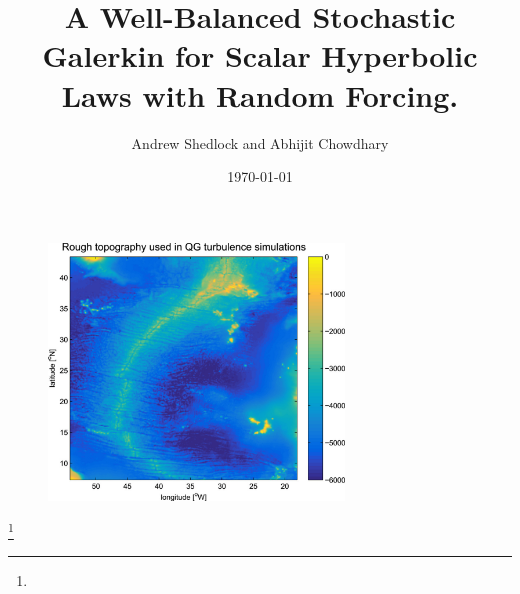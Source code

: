 \documentclass[
    pdf,
    11pt,
    xcolor={svgnames},
  ]{beamer}
\title[WBSG for Random Scalar Hyperbolic Laws]{%
  A Well-Balanced Stochastic Galerkin for Scalar Hyperbolic Laws with Random Forcing.
}
\author[Chowdhary, Shedlock]{%
  Andrew Shedlock and Abhijit Chowdhary
}
\institute[NCSU]{
  Department of Mathematics \\
  North Carolina State University
}
\date[MA788 NCSU]{\today}
\newcommand\blfootnote[1]{%
  \begingroup
  \renewcommand\thefootnote{}\footnote{\scriptsize #1}%
  \addtocounter{footnote}{-1}%
  \endgroup
}
\begin{document}
\frame{ \titlepage }

\begin{frame}
\begin{figure}
\centering
\includegraphics[width=0.70\textwidth]{slides/bottom_topography.jpg}
\end{figure}
\blfootnote{}
\end{frame}
\end{document}
